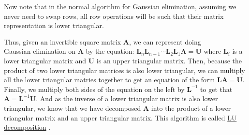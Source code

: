 \documentclass{book}
\newcommand{\hTwo}{%
   \color{MidnightBlue}%
   \fontsize{13}{15}\selectfont%
}
\newenvironment{myIndent}{%
   \begin{adjustwidth}{2.5em}{0em}%
}{%
   \end{adjustwidth}%
}
\newcommand{\udefine}[1]{%
   {\setulcolor{Red}%
   \setul{0.14em}{0.07em}%
   \ul{#1}}%
}
\newcommand{\retTwo}{\hfill\bigbreak}
\newcommand{\mMat}[1]{\mathbf{#1}}
\begin{document}
   Now note that in the normal algorithm for Gaussian elimination, assuming we never need to swap rows, all row operations will be such that their matrix representation is lower triangular. 
   
   \begin{myIndent} \hTwo
      Thus, given an invertible square matrix $\mMat{A}$, we can represent doing \\Gaussian elimination on $\mMat{A}$ by the equation: $\mMat{L}_n\mMat{L}_{n-1}\dotsb\mMat{L}_{2}\mMat{L}_{1}\mMat{A} = \mMat{U}$ where $\mMat{L}_i$ is a lower triangular matrix and $\mMat{U}$ is an upper triangular matrix. Then, because the product of two lower triangular matrices is also lower triangular, we can multiply all the lower triangular matries together to get an equation of the form $\mMat{L}\mMat{A}=\mMat{U}$. Finally, we multiply both sides of the equation on the left by $\mMat{L}^{-1}$ to get that\\ $\mMat{A}=\mMat{L}^{-1}\mMat{U}$. And as the inverse of a lower triangular matrix is also lower triangular, we know that we have decomposed $\mMat{A}$ into the product of a lower triangular matrix and an upper triangular matrix. This algorithm is called \udefine{LU decomposition}. \retTwo
   \end{myIndent}
\end{document}
